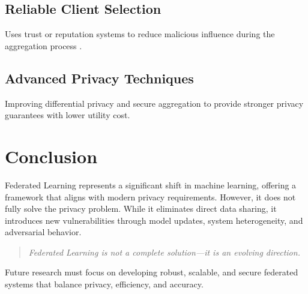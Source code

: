 \subsection{Reliable Client Selection}
Uses trust or reputation systems to reduce malicious influence during the aggregation process \cite{li2021blockchain}.

\subsection{Advanced Privacy Techniques}
Improving differential privacy and secure aggregation to provide stronger privacy guarantees with lower utility cost.

\section{Conclusion}

Federated Learning represents a significant shift in machine learning, offering a framework that aligns with modern privacy requirements. However, it does not fully solve the privacy problem. While it eliminates direct data sharing, it introduces new vulnerabilities through model updates, system heterogeneity, and adversarial behavior.

\begin{quote}
\textit{Federated Learning is not a complete solution---it is an evolving direction.}
\end{quote}

Future research must focus on developing robust, scalable, and secure federated systems that balance privacy, efficiency, and accuracy.
